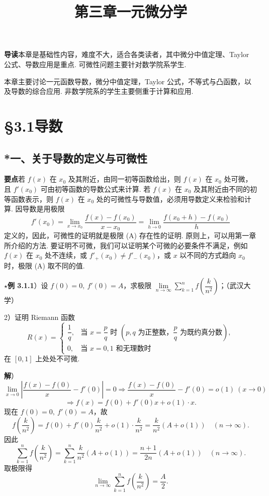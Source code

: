 \documentclass[UTF8,12pt,a4paper,fontset=fandol]{ctexart}
\title{第三章\quad 一元微分学}
\author{}
\date{}
\begin{document}
\maketitle

\noindent\textbf{导读}\quad 本章是基础性内容，难度不大，适合各类读者，其中微分中值定理、Taylor 公式、导数应用是重点. 可微性问题主要针对数学院系学生.

本章主要讨论一元函数导数，微分中值定理，Taylor 公式，不等式与凸函数，以及导数的综合应用. 非数学院系的学生主要侧重于计算和应用.

\section*{§3.1\quad 导数}

\subsection*{*一、关于导数的定义与可微性}

\noindent\textbf{要点}\quad 若 $f(x)$ 在 $x_0$ 及其附近，由同一初等函数给出，则 $f(x)$ 在 $x_0$ 处可微，且 $f'(x_0)$ 可由初等函数的导数公式来计算. 若 $f(x)$ 在 $x_0$ 及其附近由不同的初等函数表示，则 $f(x)$ 在 $x_0$ 处的可微性与导数值，必须用导数定义来检验和计算. 因导数是用极限
\begin{equation}
  f'(x_0)=\lim_{x\to x_0}\frac{f(x)-f(x_0)}{x-x_0}
  =\lim_{h\to0}\frac{f(x_0+h)-f(x_0)}h
\tag{A}
\end{equation}
定义的，因此，可微性的证明就是极限 (A) 存在性的证明. 原则上，可以用第一章所介绍的方法. 要证明不可微，我们可以证明某个可微的必要条件不满足，例如 $f(x)$ 在 $x_0$ 处不连续，或 $f'_+(x_0)\ne f'_-(x_0)$，或 $x$ 以不同的方式趋向 $x_0$ 时，极限 (A) 取不同的值.

\noindent\textbf{$\star$例 3.1.1}）设 $f(0)=0,\ f'(0)=A$，求极限 $\lim\limits_{n\to\infty}\sum\limits_{k=1}^n f\left(\dfrac{k}{n^2}\right)$；（武汉大学）

2）证明 Riemann 函数
\[
R(x)=
\begin{cases}
\dfrac1q, & \text{当 }x=\dfrac pq\text{ 时 }(p,q\text{ 为正整数，}\dfrac pq\text{ 为既约真分数}),\\
0, & \text{当 }x=0,1\text{ 和无理数时}
\end{cases}
\]
在 $[0,1]$ 上处处不可微.

\noindent\textbf{解}）$\lim\limits_{x\to0}\left|\dfrac{f(x)-f(0)}x-f'(0)\right|=0\Rightarrow\dfrac{f(x)-f(0)}x-f'(0)=o(1)\ (x\to0)$
\[
  \Rightarrow f(x)=f(0)+f'(0)x+o(1)\cdot x.
\]
现在 $f(0)=0,\ f'(0)=A$，故
\[
  f\left(\frac{k}{n^2}\right)=f(0)+f'(0)\frac{k}{n^2}+o(1)\cdot\frac{k}{n^2}
  =\frac{k}{n^2}(A+o(1))\quad(n\to\infty).
\]
因此
\[
\sum_{k=1}^n f\left(\frac{k}{n^2}\right)
=\sum_{k=1}^n\frac{k}{n^2}(A+o(1))
=\frac{n+1}{2n}(A+o(1))\quad(n\to\infty).
\]
取极限得
\[
  \lim_{n\to\infty}\sum_{k=1}^n f\left(\frac{k}{n^2}\right)=\frac A2.
\]
\end{document}
